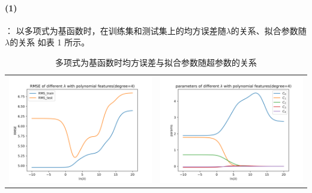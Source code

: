 \documentclass[a4paper,zihao=5,UTF8]{ctexart}
\begin{document}
    \paragraph{(1)}：
    以多项式为基函数时，在训练集和测试集上的均方误差随$\lambda$的关系、拟合参数随$\lambda$的关系
    如表 1 所示。
    \begin{table}[htbp]
        \centering
        \label{poly_params}
        \begin{tabular}[htbp]{cc}
            \includegraphics[scale=0.5]{RMSE_polynomials.png} & \includegraphics[scale=0.5]{Params_polynomials.png} \\
        \end{tabular}
        \caption{多项式为基函数时均方误差与拟合参数随超参数的关系}
    \end{table}
\end{document}
